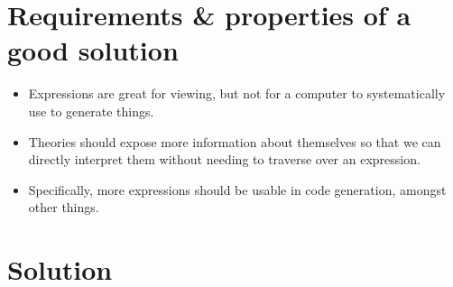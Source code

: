 \section{Requirements \& properties of a good solution}

\begin{itemize}

	\item Expressions are great for viewing, but not for a computer to
	      systematically use to generate things.

	\item Theories should expose more information about themselves so that we
	      can directly interpret them without needing to traverse over an
	      expression.

	\item Specifically, more expressions should be usable in code generation,
	      amongst other things.

\end{itemize}

\section{Solution}

